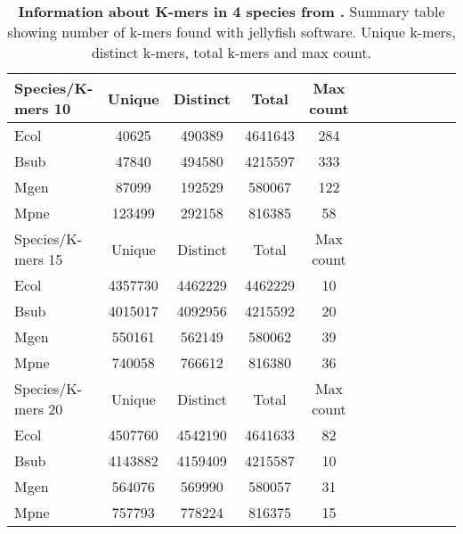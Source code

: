 %

\begin{table}[!h]
\centering
\newline
\begin{tabular}{lccccc c ccccc}
\hline
Species/K-mers 10      & Unique  & Distinct & Total & Max count  \\ \hline\hline
Ecol       & 40625 & 490389  & 4641643  & 284    \\
Bsub & 47840 & 494580  & 4215597  & 333   \\
Mgen & 87099 & 192529  & 580067  & 122  \\
Mpne    & 123499 & 292158  & 816385  & 58    \\ \hline\hline
Species/K-mers 15      & Unique  & Distinct & Total & Max count  \\ \hline\hline
Ecol       & 4357730 & 4462229  & 4462229  & 10    \\
Bsub & 4015017 & 4092956  & 4215592  & 20    \\
Mgen & 550161 & 562149  & 580062  & 39  \\
Mpne   & 740058 & 766612  & 816380  & 36    \\ \hline\hline
Species/K-mers 20      & Unique  & Distinct & Total & Max count \\ \hline\hline
Ecol       & 4507760 & 4542190  & 4641633  & 82  \\
Bsub & 4143882 & 4159409  & 4215587  & 10  \\
Mgen & 564076 & 569990  & 580057  & 31  \\
Mpne   & 757793 & 778224  & 816375  & 15  \\ \hline\hline
\end{tabular}

\caption[Information about k-mers in 4 species from \GB.]{%
\label{tbl:genbankgenomesinfo}\textbf{Information about K-mers in 4 species from \GB.} Summary table showing number of k-mers found with jellyfish software. Unique k-mers, distinct k-mers, total k-mers and max count.
}%


\end{table}
